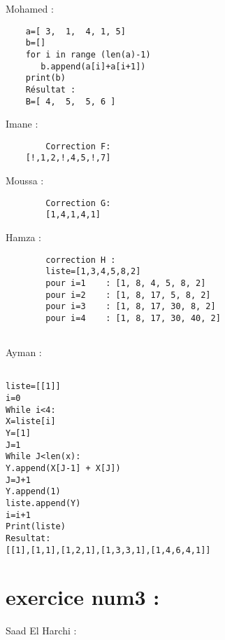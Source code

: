 \documentclass{article}
\begin{document}
	\begin{center}
    		Mohamed :
	\end{center}
	
	\begin{lstlisting}
    a=[ 3,  1,  4, 1, 5]
    b=[]
    for i in range (len(a)-1)
       b.append(a[i]+a[i+1])
    print(b)
    Résultat :
    B=[ 4,  5,  5, 6 ]
	\end{lstlisting}

	\begin{center}
    		Imane :
        \end{center} 
	
	\begin{lstlisting}
		Correction F:
	[!,1,2,!,4,5,!,7]

	\end{lstlisting}
	
    	\begin{center}
    		Moussa :
	\end{center} 
	
	\begin{lstlisting}
		Correction G:
		[1,4,1,4,1]
	\end{lstlisting}

    	\begin{center}
    		Hamza :
	\end{center} 
	\begin{lstlisting}
		correction H :
		liste=[1,3,4,5,8,2]
		pour i=1    : [1, 8, 4, 5, 8, 2]
		pour i=2    : [1, 8, 17, 5, 8, 2]
		pour i=3    : [1, 8, 17, 30, 8, 2]
		pour i=4    : [1, 8, 17, 30, 40, 2]
		
	\end{lstlisting}

	\begin{center}
    		Ayman :
	\end{center} 
	\begin{lstlisting}
	
liste=[[1]]
i=0
While i<4:
X=liste[i]
Y=[1]
J=1
While J<len(x):
Y.append(X[J-1] + X[J])
J=J+1
Y.append(1)
liste.append(Y)
i=i+1
Print(liste)
Resultat:
[[1],[1,1],[1,2,1],[1,3,3,1],[1,4,6,4,1]]
\end{lstlisting}
\section{exercice num3 :}
        \begin{center}
    		Saad El Harchi :
	\end{center}    	  
        	
\end{document}
